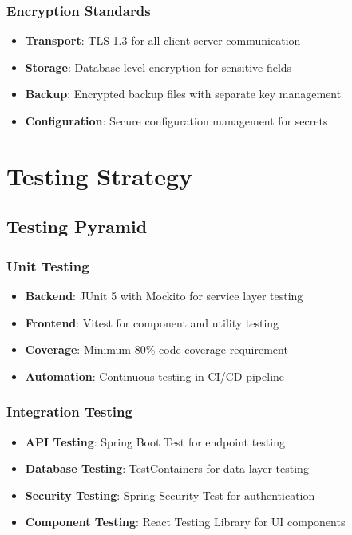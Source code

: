 \documentclass[12pt,a4paper]{article}
\begin{document}
\subsubsection{Encryption Standards}
\begin{itemize}
    \item \textbf{Transport}: TLS 1.3 for all client-server communication
    \item \textbf{Storage}: Database-level encryption for sensitive fields
    \item \textbf{Backup}: Encrypted backup files with separate key management
    \item \textbf{Configuration}: Secure configuration management for secrets
\end{itemize}

\section{Testing Strategy}

\subsection{Testing Pyramid}

\subsubsection{Unit Testing}
\begin{itemize}
    \item \textbf{Backend}: JUnit 5 with Mockito for service layer testing
    \item \textbf{Frontend}: Vitest for component and utility testing
    \item \textbf{Coverage}: Minimum 80\% code coverage requirement
    \item \textbf{Automation}: Continuous testing in CI/CD pipeline
\end{itemize}

\subsubsection{Integration Testing}
\begin{itemize}
    \item \textbf{API Testing}: Spring Boot Test for endpoint testing
    \item \textbf{Database Testing}: TestContainers for data layer testing
    \item \textbf{Security Testing}: Spring Security Test for authentication
    \item \textbf{Component Testing}: React Testing Library for UI components
\end{itemize}
\end{document}
